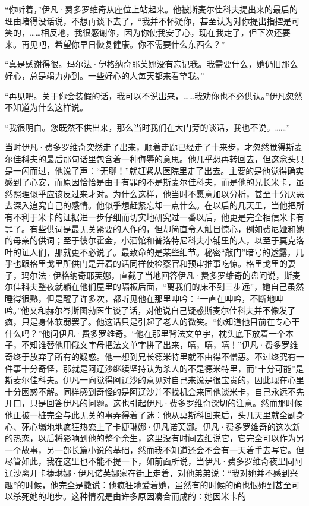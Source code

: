 \par “你听着，”伊凡·费多罗维奇从座位上站起来。他被斯麦尔佳科夫提出来的最后的理由堵得没话说，不想再谈下去了，“我并不怀疑你，甚至认为对你提出指控是可笑的，……相反地，我很感谢你，因为你使我安了心，现在我走了，但下次还要来。再见吧，希望你早日恢复健康。你不需要什么东西么？”
\par “真是感谢得很。玛尔法·伊格纳奇耶芙娜没有忘记我。我需要什么，她仍旧那么好心，总是竭力办到。一些好心的人每天都来看望我。”
\par “再见吧。关于你会装假的话，我可以不说出来，……我劝你也不必供认。”伊凡忽然不知道为什么这样说。
\par “我很明白。您既然不供出来，那么当时我们在大门旁的谈话，我也不说。……”
\par 当时伊凡·费多罗维奇突然走了出来，顺着走廊已经走了十来步，才忽然觉得斯麦尔佳科夫的最后那句话里包含着一种侮辱的意思。他几乎想再转回去，但这念头只是一闪而过，他说了声：“无聊！”就赶紧从医院里走了出去。主要的是他觉得确实感到了心安，而原因恰恰是由于有罪的不是斯麦尔佳科夫，而是他的兄长米卡，虽然照理似乎应该反过来才对。为什么这样，他当时不愿意加以分析，甚至十分厌恶去深入追究自己的感情。他似乎想赶紧忘却一点什么。在以后的几天里，当他把所有不利于米卡的证据进一步仔细而切实地研究过一番以后，他更是完全相信米卡有罪了。有些供词是最无关紧要的人作的，但却简直令人触目惊心，例如费尼娅和她的母亲的供词；至于彼尔霍金，小酒馆和普洛特尼科夫小铺里的人，以至于莫克洛叶的证人们，那就更不必说了。最致命的是某些细节。秘密“敲门”暗号的透露，几乎也跟格里戈里所供门是开着的话同样使检察官和预审推事吃惊。格里戈里的妻子，玛尔法·伊格纳奇耶芙娜，直截了当地回答伊凡·费多罗维奇的盘问说，斯麦尔佳科夫整夜就躺在他们屋里的隔板后面，“离我们的床不到三步远”，她自己虽然睡得很熟，但是醒了许多次，都听见他在那里呻吟：“一直在呻吟，不断地呻吟。”他又和赫尔岑斯图勃医生谈了话，对他说自己疑惑斯麦尔佳科夫并不像发了疯，只是身体软弱罢了。他这话只是引起了老人的微笑。“你知道他目前在专心干什么吗？”他问伊凡·费多罗维奇。“他在那里背法文单字，枕头底下放着一个本子，不知谁替他用俄文字母把法文单字拼了出来，嘻，嘻，嘻！”伊凡·费多罗维奇终于放弃了所有的疑惑。他一想到兄长德米特里就不由得不憎恶。不过终究有一件事十分奇怪，那就是阿辽沙继续坚持认为杀人的不是德米特里，而“十分可能”是斯麦尔佳科夫。伊凡一向觉得阿辽沙的意见对自己来说是很宝贵的，因此现在心里十分困惑不解。同样感到奇怪的是阿辽沙并不找机会来同他谈米卡，自己永远不先开口，只是回答伊凡的问题。这也引起伊凡·费多罗维奇深切的注意。然而那时候他正被一桩完全与此无关的事弄得着了迷：他从莫斯科回来后，头几天里就全副身心、死心塌地地疯狂热恋上了卡捷琳娜·伊凡诺芙娜。伊凡·费多罗维奇的这次新的热恋，以后将影响到他的整个余生，这里没有时间去细说它，它完全可以作为另一个故事，另一部长篇小说的基础，然而我不知道还会不会有一天着手去写它。但尽管如此，我在这里也不能不提一下，如前面所说，当伊凡·费多罗维奇夜里同阿辽沙离开卡捷琳娜·伊凡诺芙娜家在街上走着，对他弟弟说：“我对她并不感到兴趣”的时候，他完全是撒谎：他疯狂地爱着她，虽然有的时候的确也恨她到甚至可以杀死她的地步。这种情况是由许多原因凑合而成的：她因米卡的
